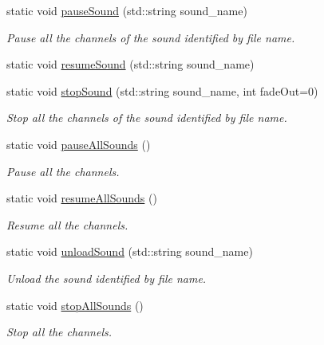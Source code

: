 \begin{DoxyCompactItemize}
static void \hyperlink{class_audio_manager_ada650abafa8b74a4a0d23cadccee033f}{pause\+Sound} (std\+::string sound\+\_\+name)
\begin{DoxyCompactList}\small\item\em Pause all the channels of the sound identified by file name. \end{DoxyCompactList}\item 
static void \hyperlink{class_audio_manager_acb3fab4f831354f04948f835b8a6c51a}{resume\+Sound} (std\+::string sound\+\_\+name)
\item 
static void \hyperlink{class_audio_manager_a654b86ffde70ecfe92028d6e5a4bd7e0}{stop\+Sound} (std\+::string sound\+\_\+name, int fade\+Out=0)
\begin{DoxyCompactList}\small\item\em Stop all the channels of the sound identified by file name. \end{DoxyCompactList}\item 
\mbox{\label{class_audio_manager_aa660fe4ee049d2606471d000c96d50a0}} 
static void \hyperlink{class_audio_manager_aa660fe4ee049d2606471d000c96d50a0}{pause\+All\+Sounds} ()
\begin{DoxyCompactList}\small\item\em Pause all the channels. \end{DoxyCompactList}\item 
\mbox{\label{class_audio_manager_af7d83968ccbfb2eac4def898630e2624}} 
static void \hyperlink{class_audio_manager_af7d83968ccbfb2eac4def898630e2624}{resume\+All\+Sounds} ()
\begin{DoxyCompactList}\small\item\em Resume all the channels. \end{DoxyCompactList}\item 
static void \hyperlink{class_audio_manager_af492087dd75a160562ef06c6600f54b5}{unload\+Sound} (std\+::string sound\+\_\+name)
\begin{DoxyCompactList}\small\item\em Unload the sound identified by file name. \end{DoxyCompactList}\item 
\mbox{\label{class_audio_manager_ac880de40f09c0065c10948ca138cc7be}} 
static void \hyperlink{class_audio_manager_ac880de40f09c0065c10948ca138cc7be}{stop\+All\+Sounds} ()
\begin{DoxyCompactList}\small\item\em Stop all the channels. \end{DoxyCompactList}\end{DoxyCompactItemize}
